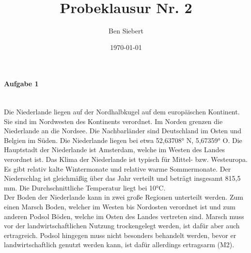 \documentclass[12pt, a4paper]{report}
\begin{document}
	\title{Probeklausur Nr. 2}
	\author{Ben Siebert}
	\date{\today}
	\maketitle
	
	\paragraph{Aufgabe 1} \mbox{} \\
	Die Niederlande liegen auf der Nordhalbkugel auf dem europäischen Kontinent.
	Sie sind im Nordwesten des Kontinents verordnet.
	Im Norden grenzen die Niederlande an die Nordsee.
	Die Nachbarländer sind Deutschland im Osten und Belgien im Süden.
	Die Niederlande liegen bei etwa 52,63708° N, 5,67359° O.
	Die Hauptstadt der Niederlande ist Amsterdam, welche im Westen des Landes verordnet ist.
	Das Klima der Niederlande ist typisch für Mittel- bzw. Westeuropa.
	Es gibt relativ kalte Wintermonate und relative warme Sommermonate.
	Der Niederschlag ist gleichmäßig über das Jahr verteilt und beträgt insgesamt 815,5 mm.
	Die Durchschnittliche Temperatur liegt bei 10°C. \\
	Der Boden der Niederlande kann in zwei große Regionen unterteilt werden.
	Zum einen Marsch Boden, welcher im Westen bis Nordosten verordnet ist und zum anderen Podsol Böden, welche im Osten des Landes vertreten sind.
	Marsch muss vor der landwirtschaftlichen Nutzung trockengelegt werden, ist dafür aber auch ertragreich.
	Podsol hingegen muss nicht besonders behandelt werden, bevor er landwirtschaftlich genutzt werden kann, ist dafür allerdings ertragsarm (M2).
\end{document}
